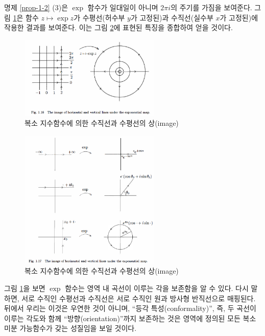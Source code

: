 명제 \ref{prop-1-2} (3)은 $\exp$ 함수가 일대일이 아니며
$2\pi i$의 주기를 가짐을 보여준다.
그림 \ref{fig-1-16}은 함수 $z\mapsto \exp z$가
수평선(허수부 $y$가 고정된)과 수직선(실수부 $x$가 고정된)에 작용한 결과를 보여준다.
이는 그림 \ref{fig-1-17}에 표현된 특징을 종합하여 얻을 것이다.

\begin{figure}[!h]
\begin{center}
\includegraphics[width=0.6\textwidth]{./SaltChapter/fig-1-16}
\end{center}
\caption{복소 지수함수에 의한 수직선과 수평선의 상(image)}
\label{fig-1-16}
\end{figure}

\begin{figure}[!h]
\begin{center}
\includegraphics[width=0.6\textwidth]{./SaltChapter/fig-1-17}
\end{center}
\caption{복소 지수함수에 의한 수직선과 수평선의 상(image)}
\label{fig-1-17}
\end{figure}

그림 \ref{fig-1-16}을 보면
$\exp$ 함수는 영역 내 곡선이 이루는 각을 보존함을 알 수 있다.
다시 말하면, 서로 수직인 수평선과 수직선은 서로 수직인 원과 방사형 반직선으로 매핑된다.
뒤에서 우리는 이것은 우연한 것이 아니며, ``등각 특성(conformality)'', 즉, 
두 곡선이 이루는 각도와 함께 ``방향(orientation)''까지 보존하는 것은
영역에 정의된 모든 복소미분 가능함수가 갖는 성질임을 보일 것이다.

